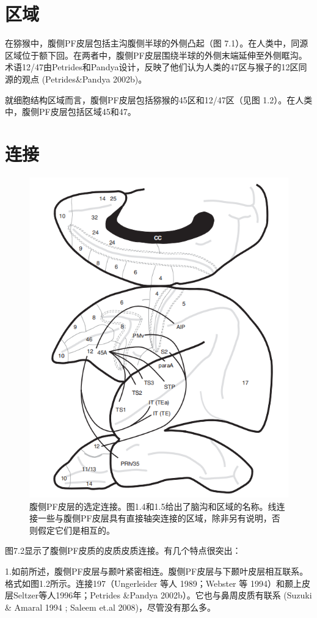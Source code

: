 \section{区域}
\par
在猕猴中，腹侧PF皮层包括主沟腹侧半球的外侧凸起（图 7.1）。在人类中，同源区域位于额下回。在两者中，腹侧PF皮层围绕半球的外侧末端延伸至外侧眶沟。术语12/47由Petrides和Pandya设计，反映了他们认为人类的47区与猴子的12区同源的观点 (Petrides\&Pandya 2002b)。
\par
就细胞结构区域而言，腹侧PF皮层包括猕猴的45区和12/47区（见图 1.2）。在人类中，腹侧PF皮层包括区域45和47。
\section{连接}
\begin{figure}
	\centering
	\includegraphics[width=0.7\linewidth]{image_pfc/Fig_7_2}
	\caption{腹侧PF皮层的选定连接。图1.4和1.5给出了脑沟和区域的名称。线连接一些与腹侧PF皮层具有直接轴突连接的区域，除非另有说明，否则假定它们是相互的。}
	\label{fig:fig}
\end{figure}
图7.2显示了腹侧PF皮质的皮质皮质连接。有几个特点很突出：
\par
1.如前所述，腹侧PF皮层与颞叶紧密相连。腹侧PF皮层与下颞叶皮层相互联系。格式如图1.2所示。连接197（Ungerleider 等人 1989；Webster 等 1994）和颞上皮层Seltzer等人1996年；Petrides \&Pandya 2002b）。它也与鼻周皮质有联系 (Suzuki \& Amaral 1994 ; Saleem et.al 2008)，尽管没有那么多。 
\par
